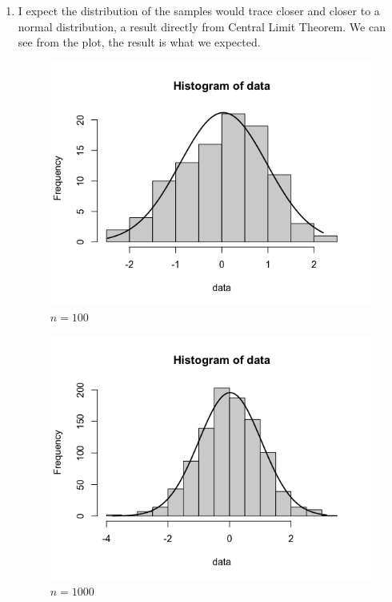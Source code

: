\documentclass{article}
\begin{document}
\begin{enumerate}[label=(\arabic*)]
    \item I expect the distribution of the samples would trace closer and closer to a normal distribution, a result directly from Central Limit Theorem. 
    We can see from the plot, the result is what we expected.
    \begin{figure}[h]
        \qquad
        \begin{minipage}{.4\textwidth}
            \centering
            {\includegraphics[scale=0.3]{n=100.png}}
            \qquad\qquad$n=100$\label{fig:1}
        \end{minipage}    
        \qquad
        \begin{minipage}{.4\textwidth}
            \centering
            {\includegraphics[scale=0.3]{n=1000.png}}
            \qquad\qquad$n=1000$\label{fig:2}
        \end{minipage}   
    \end{figure}
\end{enumerate}
\end{document}
